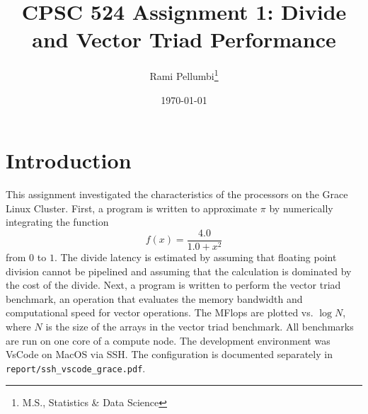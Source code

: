 \documentclass{article}
\title{CPSC 524 Assignment 1: Divide and Vector Triad Performance}
\author{Rami Pellumbi\thanks{M.S., Statistics \& Data Science}}
\date{\today}
\begin{document}
\maketitle

\newpage 

\section{Introduction}
This assignment investigated the characteristics of the processors on the Grace 
Linux Cluster. First, a program is written to approximate $\pi$ by numerically 
integrating the function 
$$f(x) = \frac{4.0}{1.0 + x^2}$$
from $0$ to $1$. The divide latency is estimated by assuming that floating point 
division cannot be pipelined and assuming that the calculation is dominated by 
the cost of the divide. Next, a program is written to perform the vector triad benchmark, 
an operation that evaluates the memory bandwidth and computational speed for vector operations. The MFlops are plotted vs. $\log N$, where 
$N$ is the size of the arrays in the vector triad benchmark. All benchmarks are run on one core of a compute node. The development 
environment was VsCode on MacOS via SSH. The configuration is documented separately 
in \texttt{report/ssh\_vscode\_grace.pdf}.
\end{document}
